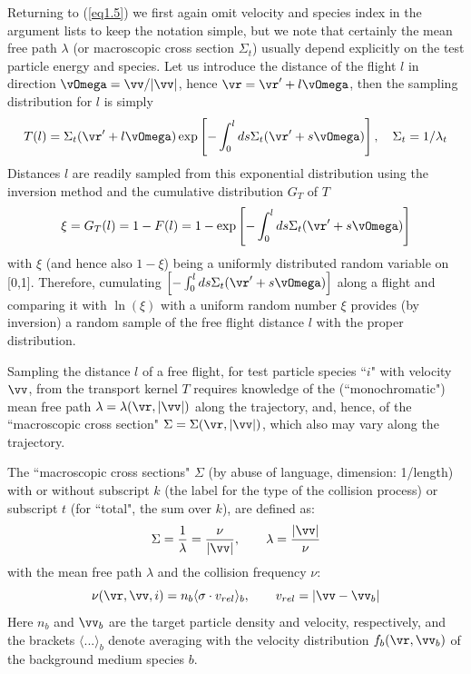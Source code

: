 Returning to (\ref{eq1.5})
we first  again omit velocity and species index in the argument lists to keep the notation simple, but we note that certainly
the mean free path $\lambda$ (or macroscopic cross section $\Sigma_t$) usually depend explicitly on the test particle energy and species.
Let us introduce the distance of the flight $l$ in direction $\vOmega=\vv/|\vv|$, hence
$\vr=\vr'+l\vOmega$, then the sampling distribution for $l$ is simply
\begin{equation}
T(l)=\Sigma_t(\vr'+l\vOmega)\exp\left[-\int_0^l ds \Sigma_t(\vr'+s\vOmega)\right], \quad \Sigma_t=1/\lambda_t
\end{equation}
Distances $l$ are readily sampled from this exponential distribution using the
inversion method and the cumulative distribution $G_T$ of $T$
\begin{equation}\label{cummul}
\xi=G_T(l)=1-F(l)=1-\exp\left[-\int_0^l ds \Sigma_t(\vr'+s\vOmega)\right]
\end{equation}
with $\xi$ (and hence also $1-\xi$) being a uniformly distributed  random variable on [0,1].
Therefore, cumulating $\left[-\int_0^l ds \Sigma_t(\vr'+s\vOmega)\right]$ along a flight and comparing it with
$\ln(\xi)$ with a uniform random number $\xi$ provides (by inversion) a random sample of the free flight distance $l$
with the proper distribution.

Sampling the distance $l$ of a free flight, for test particle species ``$i$" with velocity $\vv$, from the transport
kernel $T$ requires knowledge of the (``monochromatic") mean free
path $\lambda = \lambda(\vr,|\vv|)$ along the
trajectory, and, hence, of the ``macroscopic cross section"
$\Sigma = \Sigma(\vr,|\vv|)$, which also may
vary along the trajectory.

The ``macroscopic cross sections" $\Sigma$ (by abuse of language,
dimension: 1/length) with or without subscript $k$ (the label for
the type of the collision process) or subscript $t$ (for ``total", the sum
over $k$), are defined as:
\begin{equation}
\Sigma = \frac{1}{\lambda} = \frac{\nu}{|\vv|}, \qquad
\lambda = \frac{|\vv|}{\nu}
\end{equation}
with the mean free path $\lambda$ and the collision frequency
$\nu$:
\begin{equation}
\nu(\vr,\vv,i) = n_b \langle\sigma \cdot
v_{rel}\rangle_b, \qquad v_{rel}= |\vv-\vv_b|
\end{equation}
Here $n_b$ and $\vv_b$ are the target particle density
and velocity, respectively, and the brac\-kets
$\langle...\rangle_b$ denote averaging with the velocity
distribution $f_b(\vr,\vv_b)$ of the
background medium species $b$.

